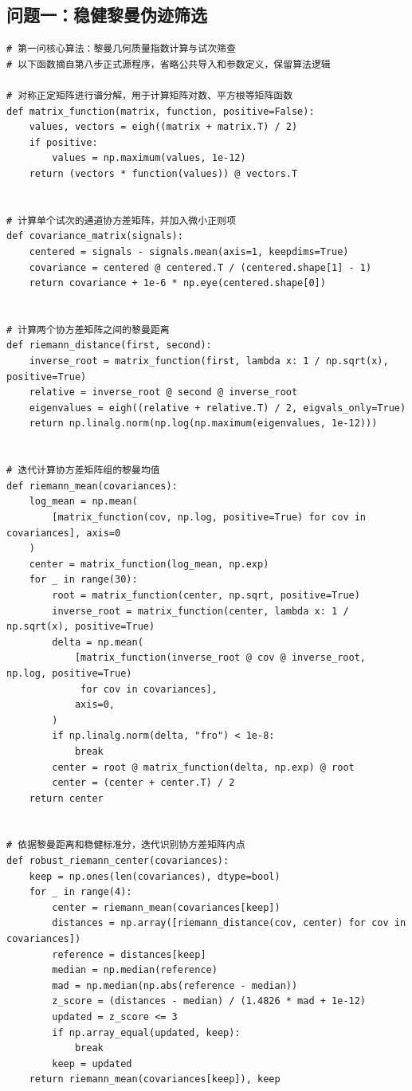 \begin{appendices}
\clearpage
\section{问题一：稳健黎曼伪迹筛选}
\begin{lstlisting}[style=appendixPython]
# 第一问核心算法：黎曼几何质量指数计算与试次筛查
# 以下函数摘自第八步正式源程序，省略公共导入和参数定义，保留算法逻辑

# 对称正定矩阵进行谱分解，用于计算矩阵对数、平方根等矩阵函数
def matrix_function(matrix, function, positive=False):
    values, vectors = eigh((matrix + matrix.T) / 2)
    if positive:
        values = np.maximum(values, 1e-12)
    return (vectors * function(values)) @ vectors.T


# 计算单个试次的通道协方差矩阵，并加入微小正则项
def covariance_matrix(signals):
    centered = signals - signals.mean(axis=1, keepdims=True)
    covariance = centered @ centered.T / (centered.shape[1] - 1)
    return covariance + 1e-6 * np.eye(centered.shape[0])


# 计算两个协方差矩阵之间的黎曼距离
def riemann_distance(first, second):
    inverse_root = matrix_function(first, lambda x: 1 / np.sqrt(x), positive=True)
    relative = inverse_root @ second @ inverse_root
    eigenvalues = eigh((relative + relative.T) / 2, eigvals_only=True)
    return np.linalg.norm(np.log(np.maximum(eigenvalues, 1e-12)))


# 迭代计算协方差矩阵组的黎曼均值
def riemann_mean(covariances):
    log_mean = np.mean(
        [matrix_function(cov, np.log, positive=True) for cov in covariances], axis=0
    )
    center = matrix_function(log_mean, np.exp)
    for _ in range(30):
        root = matrix_function(center, np.sqrt, positive=True)
        inverse_root = matrix_function(center, lambda x: 1 / np.sqrt(x), positive=True)
        delta = np.mean(
            [matrix_function(inverse_root @ cov @ inverse_root, np.log, positive=True)
             for cov in covariances],
            axis=0,
        )
        if np.linalg.norm(delta, "fro") < 1e-8:
            break
        center = root @ matrix_function(delta, np.exp) @ root
        center = (center + center.T) / 2
    return center


# 依据黎曼距离和稳健标准分，迭代识别协方差矩阵内点
def robust_riemann_center(covariances):
    keep = np.ones(len(covariances), dtype=bool)
    for _ in range(4):
        center = riemann_mean(covariances[keep])
        distances = np.array([riemann_distance(cov, center) for cov in covariances])
        reference = distances[keep]
        median = np.median(reference)
        mad = np.median(np.abs(reference - median))
        z_score = (distances - median) / (1.4826 * mad + 1e-12)
        updated = z_score <= 3
        if np.array_equal(updated, keep):
            break
        keep = updated
    return riemann_mean(covariances[keep]), keep



\end{lstlisting}
\end{appendices}
